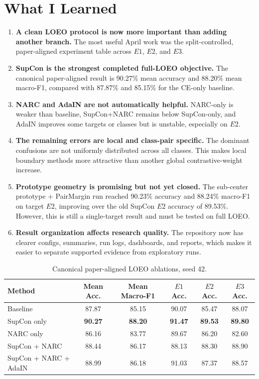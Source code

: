 \documentclass[11pt]{article}
\begin{document}
\section{What I Learned}

\begin{enumerate}[leftmargin=*]
    \item \textbf{A clean LOEO protocol is now more important than adding another branch.} The most useful April work was the split-controlled, paper-aligned experiment table across $E1$, $E2$, and $E3$.

    \item \textbf{SupCon is the strongest completed full-LOEO objective.} The canonical paper-aligned result is 90.27\% mean accuracy and 88.20\% mean macro-F1, compared with 87.87\% and 85.15\% for the CE-only baseline.

    \item \textbf{NARC and AdaIN are not automatically helpful.} NARC-only is weaker than baseline, SupCon+NARC remains below SupCon-only, and AdaIN improves some targets or classes but is unstable, especially on $E2$.

    \item \textbf{The remaining errors are local and class-pair specific.} The dominant confusions are not uniformly distributed across all classes. This makes local boundary methods more attractive than another global contrastive-weight increase.

    \item \textbf{Prototype geometry is promising but not yet closed.} The sub-center prototype + PairMargin run reached 90.23\% accuracy and 88.24\% macro-F1 on target $E2$, improving over the old SupCon $E2$ accuracy of 89.53\%. However, this is still a single-target result and must be tested on full LOEO.

    \item \textbf{Result organization affects research quality.} The repository now has clearer configs, summaries, run logs, dashboards, and reports, which makes it easier to separate supported evidence from exploratory runs.
\end{enumerate}

\begin{table}[h]
\centering
\caption{Canonical paper-aligned LOEO ablations, seed 42.}
\small
\begin{tabular}{lccccc}
\toprule
Method & Mean Acc. & Mean Macro-F1 & $E1$ Acc. & $E2$ Acc. & $E3$ Acc. \\
\midrule
Baseline & 87.87 & 85.15 & 90.07 & 85.47 & 88.07 \\
SupCon only & \textbf{90.27} & \textbf{88.20} & \textbf{91.47} & \textbf{89.53} & \textbf{89.80} \\
NARC only & 86.16 & 83.77 & 89.67 & 86.20 & 82.60 \\
SupCon + NARC & 88.44 & 86.17 & 88.13 & 88.30 & 88.90 \\
SupCon + NARC + AdaIN & 88.99 & 86.18 & 91.03 & 87.37 & 88.57 \\
\bottomrule
\end{tabular}
\end{table}
\end{document}
